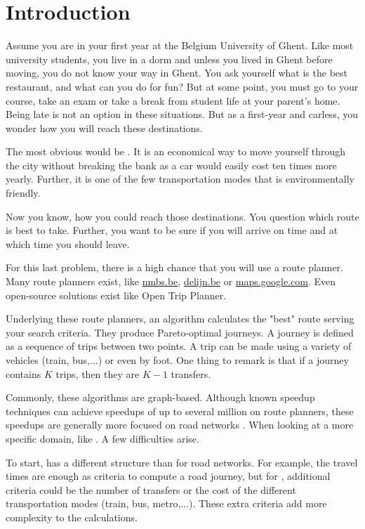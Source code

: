 \chapter{Introduction}
\label{chap:intro}

Assume you are in your first year at the Belgium University of Ghent. Like most university students, you live in a dorm and unless you lived in Ghent before moving, you do not know your way in Ghent. You ask yourself what is the best restaurant, and what can you do for fun? But at some point, you must go to your course, take an exam or take a break from student life at your parent's home. Being late is not an option in these situations. But as a first-year and carless, you wonder how you will reach these destinations.  


The most obvious would be . It is an economical way to move yourself through the city without breaking the bank as a car would easily cost ten times more yearly. Further, it is one of the few transportation modes that is environmentally friendly.

Now you know, how you could reach those destinations. You question which route is best to take. Further, you want to be sure if you will arrive on time and at which time you should leave. 

For this last problem, there is a high chance that you will use a route planner. Many route planners exist, like \url{nmbs.be}, \url{delijn.be} or \url{maps.google.com}. Even open-source solutions exist like Open Trip Planner\cite{noauthor_otp_2023}.

Underlying these route planners, an algorithm calculates the "best" route serving your search criteria. They produce Pareto-optimal journeys. A journey is defined as a sequence of trips between two points. A trip can be made using a variety of vehicles (train, bus,...) or even by foot. One thing to remark is that if a journey contains $K$ trips, then they are $K-1$ transfers. %

Commonly, these algorithms are graph-based. Although known speedup techniques can achieve speedups of up to several million on route planners, these speedups are generally more focused on road networks \cite{delling_round-based_2015}. When looking at a more specific domain, like . A few difficulties arise.

To start,  has a different structure than for road networks. For example, the travel times are enough as criteria to compute a road journey, but for , additional criteria could be the number of transfers or the cost of the different transportation modes (train, bus, metro,...). These extra criteria add more complexity to the calculations.

